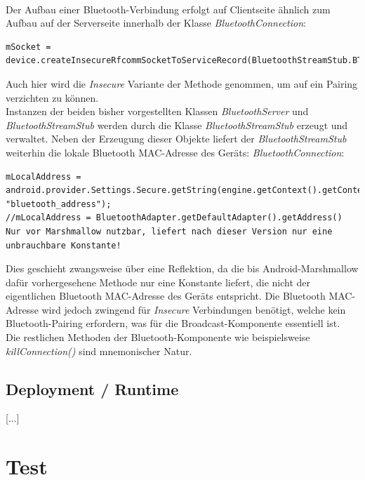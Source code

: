 \\Der Aufbau einer Bluetooth-Verbindung erfolgt auf Clientseite ähnlich zum Aufbau auf der Serverseite innerhalb der Klasse \textit{BluetoothConnection}:
 \lstset{language=Java, caption=Clientseitige Initialisierung des Sockets, label=DescriptiveLabel, numbers=left, numbersep=1em, breaklines=true, basicstyle=\small}
\begin{lstlisting}
mSocket = device.createInsecureRfcommSocketToServiceRecord(BluetoothStreamStub.BT_UUID)
\end{lstlisting}
Auch hier wird die \textit{Insecure} Variante der Methode genommen, um auf ein Pairing verzichten zu können.
\\Instanzen der beiden bisher vorgestellten Klassen \textit{BluetoothServer} und \textit{BluetoothStreamStub} werden durch die Klasse \textit{BluetoothStreamStub} erzeugt und verwaltet. Neben der Erzeugung dieser Objekte liefert der \textit{BluetoothStreamStub} weiterhin die lokale Bluetooth MAC-Adresse des Geräts:
\textit{BluetoothConnection}:
\lstset{language=Java, caption=Auslesen der Bluetooth MAC-Adresse, label=DescriptiveLabel, numbers=left, numbersep=1em, breaklines=true, basicstyle=\small}
\begin{lstlisting}
mLocalAddress = android.provider.Settings.Secure.getString(engine.getContext().getContentResolver(), "bluetooth_address");
//mLocalAddress = BluetoothAdapter.getDefaultAdapter().getAddress() Nur vor Marshmallow nutzbar, liefert nach dieser Version nur eine unbrauchbare Konstante!
\end{lstlisting}
Dies geschieht zwangsweise über eine Reflektion, da die bis Android-Marshmallow dafür vorhergesehene Methode nur eine Konstante liefert, die nicht der eigentlichen Bluetooth MAC-Adresse des Geräts entspricht. Die Bluetooth MAC-Adresse wird jedoch zwingend für \textit{Insecure} Verbindungen benötigt, welche kein Bluetooth-Pairing erfordern, was für die Broadcast-Komponente essentiell ist. 
\\Die restlichen Methoden der Bluetooth-Komponente wie beispielsweise \textit{killConnection()} sind mnemonischer Natur.

\subsection{Deployment / Runtime}
[...]


\section{Test}
